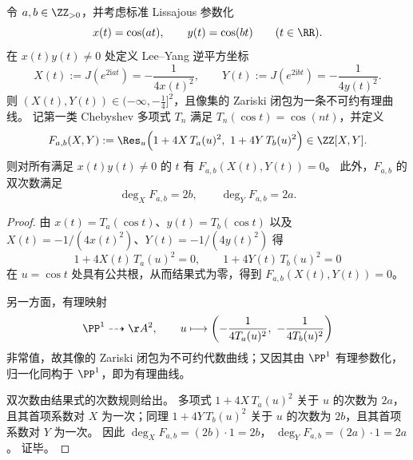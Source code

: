 \begin{theorem}\label{thm:leyang-lissajous-chebyshev-resultant}
令 \(a,b\in\ZZ_{>0}\)，并考虑标准 Lissajous 参数化
\[
x(t)=\cos(at),\qquad y(t)=\cos(bt)\qquad(t\in\RR).
\]
在 \(x(t)y(t)\neq 0\) 处定义 Lee--Yang 逆平方坐标
\[
X(t):=J(e^{2\mathrm{i}at})=-\frac{1}{4x(t)^2},\qquad
Y(t):=J(e^{2\mathrm{i}bt})=-\frac{1}{4y(t)^2}.
\]
则 \((X(t),Y(t))\in(-\infty,-\tfrac14]^2\)，且像集的 Zariski 闭包为一条不可约有理曲线。
记第一类 Chebyshev 多项式 \(T_n\) 满足 \(T_n(\cos t)=\cos(nt)\)，并定义
\begin{equation}\label{eq:leyang-lissajous-chebyshev-resultant}
F_{a,b}(X,Y):=\Res_u\Bigl(1+4X\,T_a(u)^2,\ 1+4Y\,T_b(u)^2\Bigr)\in\ZZ[X,Y].
\end{equation}
则对所有满足 \(x(t)y(t)\neq 0\) 的 \(t\) 有 \(F_{a,b}(X(t),Y(t))=0\)。
此外，\(F_{a,b}\) 的双次数满足
\[
\deg_X F_{a,b}=2b,\qquad \deg_Y F_{a,b}=2a.
\]
\end{theorem}
\begin{proof}
由 \(x(t)=T_a(\cos t)\)、\(y(t)=T_b(\cos t)\) 以及 \(X(t)=-1/(4x(t)^2)\)、\(Y(t)=-1/(4y(t)^2)\) 得
\[
1+4X(t)\,T_a(u)^2=0,\qquad 1+4Y(t)\,T_b(u)^2=0
\]
在 \(u=\cos t\) 处具有公共根，从而结果式为零，得到 \(F_{a,b}(X(t),Y(t))=0\)。
\par
另一方面，有理映射
\[
\PP^1\dashrightarrow \AA^2,\qquad
u\longmapsto \left(-\frac{1}{4T_a(u)^2},\ -\frac{1}{4T_b(u)^2}\right)
\]
非常值，故其像的 Zariski 闭包为不可约代数曲线；又因其由 \(\PP^1\) 有理参数化，归一化同构于 \(\PP^1\)，即为有理曲线。
\par
双次数由结果式的次数规则给出。
多项式 \(1+4X\,T_a(u)^2\) 关于 \(u\) 的次数为 \(2a\)，且其首项系数对 \(X\) 为一次；同理 \(1+4Y\,T_b(u)^2\) 关于 \(u\) 的次数为 \(2b\)，且其首项系数对 \(Y\) 为一次。
因此
\(\deg_X F_{a,b}=(2b)\cdot 1=2b\)，
\(\deg_Y F_{a,b}=(2a)\cdot 1=2a\)。
证毕。
\end{proof}

\endinput

